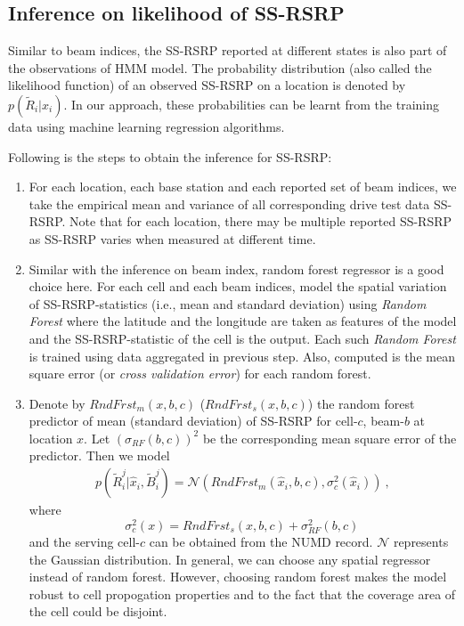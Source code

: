 \documentclass[conference, 10pt]{IEEEtran}
\begin{document}
\subsection{Inference on likelihood of SS-RSRP}
\label{sec:prob-reg}
Similar to beam indices, the SS-RSRP reported at different states
is also part of the observations of HMM model. The probability
distribution (also called the likelihood function) of an observed SS-RSRP on a location is denoted by
$p(\tilde{R}_i|\hat{x}_{i})$. In our approach, these probabilities
can be learnt from the training data using machine learning regression algorithms. 

Following is the steps to obtain the inference for SS-RSRP:

\begin{enumerate}
\item For each location, each base station and each reported set of beam indices, we
take the empirical mean and variance of all corresponding drive test data SS-RSRP. Note that for each location, there may be multiple reported SS-RSRP as SS-RSRP varies when measured at different time.

\item Similar with the inference on beam index, random forest regressor is a good choice here. For each cell and each beam indices, model the spatial variation of SS-RSRP-statistics (i.e., mean and
standard deviation) using {\em Random Forest} where the latitude and the longitude are 
taken as features of the model and the SS-RSRP-statistic  of the cell is the output. Each such {\em
Random Forest} is trained using data aggregated in previous step. Also,
computed is the mean square error (or {\em cross validation error})
for each random forest. 

\item Denote by $RndFrst_m(x,b,c)$ ($RndFrst_s(x,b,c)$) the random forest predictor of
mean (standard deviation) of SS-RSRP for cell-$c$, beam-$b$
at location $x$. Let $(\sigma_{RF}(b,c))^2$ be the corresponding
mean square error of the predictor. Then we model
\begin{align}
p(\tilde{R}^j_i|\hat{x}_{i}, \tilde{B}^j_i) =
\mathcal{N}(RndFrst_m(\hat{x}_{i},b,c), \sigma_c^2(\hat{x}_i))\ ,
\label{eqn:rndfrst}
\end{align}
where $$\sigma_c^2(x) = RndFrst_s(x,b,c) + \sigma_{RF}^2(b,c)\,$$ 
and the serving cell-$c$ can be obtained from the NUMD record. $\mathcal{N}$ represents the Gaussian distribution.
In general, we
can choose any spatial regressor instead of random forest. However, choosing
random forest makes the model robust to cell propogation properties and to the
fact that the coverage area of the cell could be disjoint.
\end{enumerate}
\end{document}
